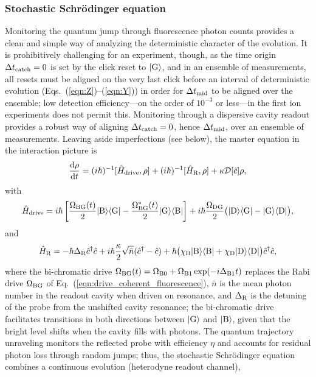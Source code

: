 \documentclass[
						superscriptaddress, 																 amsmath, amssymb,
		 aps,  prb,  
										floatfix,
		linenumbers,
			]{revtex4-1}
\begin{document}
\subsubsection{Stochastic Schr\"odinger equation}
Monitoring the quantum jump through fluorescence photon counts provides a clean and simple way of analyzing the deterministic character of the evolution. It is prohibitively challenging for an experiment, though, as the time origin $\Delta t_{\rm catch}=0$ is set by the click reset to $|{\rm G}\rangle$, and in an ensemble of measurements, all resets must be aligned on the very last click before an interval of deterministic evolution (Eqs.~(\ref{eqn:Z})--(\ref{eqn:Y})) in order for $\Delta t_{\rm mid}$ to be aligned over the ensemble; low detection efficiency---on the order of $10^{-3}$ or less\cite{Nagourney1986,Sauter1986,Bergquist1986}---in the first ion experiments does not permit this. Monitoring through a dispersive cavity readout provides a robust way of aligning $\Delta t_{\rm catch}=0$, hence $\Delta t_{\rm mid}$, over an ensemble of measurements. Leaving aside imperfections (see below), the master equation in the interaction picture is
\begin{equation}
\frac{\mathrm{d}\rho}{\mathrm{d}t}=(i\hbar)^{-1}[\hat H_{\rm drive},\rho]+(i\hbar)^{-1}[\hat H_{\rm R},\rho]+\kappa{\cal D}[\hat c]\rho,
\end{equation}
with
\begin{equation}
\hat H_{\rm drive}=i\hbar\left[\frac{\Omega_{\rm BG}(t)}2|{\rm B}\rangle\langle {\rm G}|-\frac{\Omega_{\rm BG}^*(t)}2|{\rm G}\rangle\langle{\rm B}|\right]+i\hbar\frac{\Omega_{\rm DG}}2\big(|{\rm D}\rangle\langle{\rm G}|-|{\rm G}\rangle\langle{\rm D}|\big),
\end{equation}
and
\begin{equation}
\hat H_{\rm R}=-\hbar\Delta_{\rm R}\hat c^\dagger\hat c+i\hbar\frac{\kappa}2\sqrt{\bar n}(\hat c^\dagger-\hat c)+\hbar\big(\chi_{\rm B}|{\rm B}\rangle\langle{\rm B}|+\chi_{\rm D}|{\rm D}\rangle\langle{\rm D}|\big)\hat c^\dagger\hat c,
\end{equation}
where the bi-chromatic drive $\Omega_{\rm BG}(t)=\Omega_{{\rm B}0}+\Omega_{{\rm B}1}\exp(-i\Delta_{{\rm B}1}t)$ replaces the Rabi drive $\Omega_{\rm BG}$ of Eq.~(\ref{eqn:drive_coherent_fluorescence}), $\bar n$ is the mean photon number in the readout cavity when driven on resonance, and $\Delta_{\rm R}$ is the detuning of the probe from the unshifted cavity resonance; the bi-chromatic drive facilitates transitions in both directions between $|{\rm G}\rangle$ and $|{\rm B}\rangle$, given that the bright level shifts when the cavity fills with photons. The quantum  trajectory unraveling monitors the reflected probe with efficiency $\eta$ and accounts for residual photon loss through random jumps; thus, the stochastic Schr\"odinger equation combines a continuous evolution (heterodyne readout channel),
\end{document}
